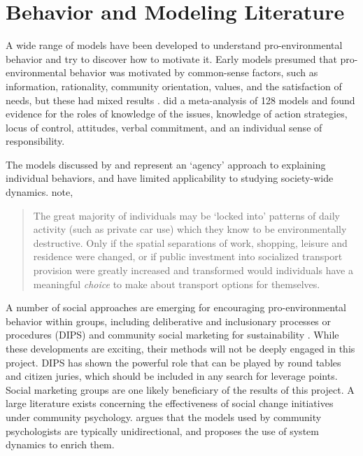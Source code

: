 \documentclass[12pt, oneside]{amsart}
\begin{document}
\section{Behavior and Modeling Literature}

A wide range of models have been developed to understand pro-environmental behavior and try to discover how to motivate it.  Early models presumed that pro-environmental behavior was motivated by common-sense factors, such as information, rationality, community orientation, values, and the satisfaction of needs, but these had mixed results \citep{kollmuss2002mind}.  \citet{Hines1986} did a meta-analysis of 128 models and found evidence for the roles of knowledge of the issues, knowledge of action strategies, locus of control, attitudes, verbal commitment, and an individual sense of responsibility.

The models discussed by \citeauthor{kollmuss2002mind} and \citeauthor{Hines1986} represent an `agency' approach to explaining individual behaviors, and have limited applicability to studying society-wide dynamics.  \citet{redclift1994social} note,
\begin{quotation}
\begin{small}
The great majority of individuals may be `locked into' patterns of daily activity (such as private car use) which they know to be environmentally destructive.  Only if the spatial separations of work, shopping, leisure and residence were changed, or if public investment into socialized transport provision were greatly increased and transformed would individuals have a meaningful \emph{choice} to make about transport options for themselves.
\end{small}
\end{quotation}

A number of social approaches are emerging for encouraging pro-environmental behavior within groups, including deliberative and inclusionary processes or procedures (DIPS) and community social marketing for sustainability \citep{bloomfield1998deliberative, mckenzie1999fostering}.  While these developments are exciting, their methods will not be deeply engaged in this project.  DIPS has shown the powerful role that can be played by round tables and citizen juries, which should be included in any search for leverage points.  Social marketing groups are one likely beneficiary of the results of this project.  A large literature exists concerning the effectiveness of social change initiatives under community psychology.  \citep{Hirsch2007} argues that the models used by community psychologists are typically unidirectional, and proposes the use of system dynamics to enrich them.
\end{document}
